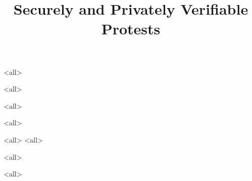 \title{%
  Securely and Privately Verifiable Protests
}

\maketitle

\mode*

\begin{abstract}
  
\end{abstract}

\clearpage
\tableofcontents
\clearpage

\mode<all>


\mode<all>

\mode<all>

\mode<all>


\mode<all>
%
\mode<all>
%

\mode<all>

\mode<all>




\begin{frame}[allowframebreaks]
  \printbibliography{}
\end{frame}
